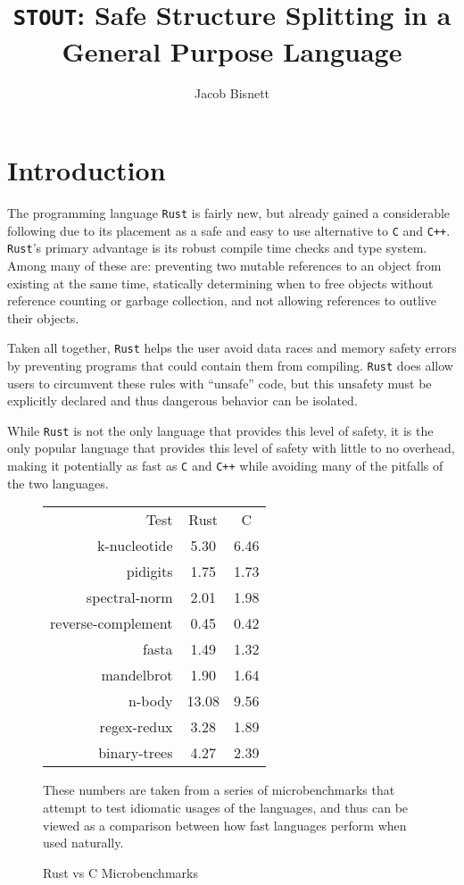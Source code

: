 \documentclass[prodmode,acmtecs]{acmsmall} %
\newcommand{\rustname}{{\texttt{Rust}}}
\def \rust {\rustname{}\xspace}
\newcommand{\cname}{{\texttt{C}}}
\def \c {\cname{}\xspace}
\newcommand{\cppname}{{\texttt{C++}}}
\def \cpp {\cppname{}\xspace}
\newcommand{\projectname}{{\texttt{STOUT}}}
\def \name{\projectname\xspace}
\begin{document}
\title{\name: Safe Structure Splitting in a General Purpose Language}
\author{Jacob Bisnett}
\maketitle
{}
\section{Introduction}
\label{sec:intro}

The programming language \rust is fairly new, but already gained a considerable
following due to its placement as a safe and easy to use alternative to \c and
\cpp. \rust's primary advantage is its robust compile time checks and type
system. Among many of these are:
preventing two mutable references to an object from existing at the same time, 
statically determining when to free objects without reference counting or
garbage collection,
and not allowing references to outlive their objects.

Taken all together, \rust helps the user avoid data races and memory safety
errors by preventing programs that could contain them from compiling.
\rust does allow users to circumvent these rules with ``unsafe'' code,
but this unsafety must be explicitly declared and thus dangerous behavior can be
isolated.

While \rust is not the only language that provides this level of safety, it is
the only popular language that provides this level of safety with little to no overhead,
making it potentially as fast as \c and \cpp while avoiding many of the
pitfalls of the two languages.

\begin{figure}
  \centering
\begin{tabular}{r|c|c}
  Test&Rust&C\\
  k-nucleotide&5.30&6.46\\
  pidigits&1.75&1.73\\
  spectral-norm&2.01&1.98\\
  reverse-complement&0.45&0.42\\
  fasta&1.49&1.32\\
  mandelbrot&1.90&1.64\\
  n-body&13.08&9.56\\
  regex-redux&3.28&1.89\\
  binary-trees&4.27&2.39\\
\end{tabular}

  These numbers are taken from a series of microbenchmarks that attempt to 
  test idiomatic usages of the languages, and thus can be viewed as a comparison
  between how fast languages perform when used naturally.\cite{bench}
  \caption{Rust vs C Microbenchmarks}
  \label{fig:bench}
\end{figure}
\end{document}
